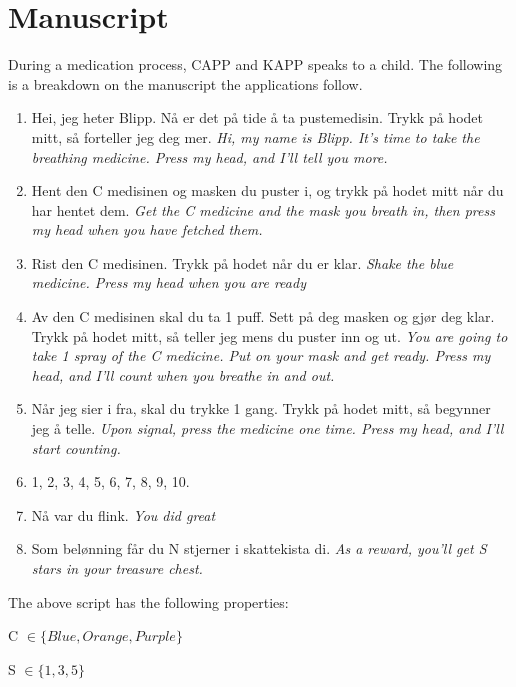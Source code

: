 \chapter{Manuscript}
\label{chp:anuscript} %
During a medication process, CAPP and KAPP speaks to a child. The following is a breakdown on the manuscript the applications follow.
\begin{enumerate}
  \item Hei, jeg heter Blipp. N\r{a} er det p\r{a} tide \r{a} ta pustemedisin. Trykk p\r{a} hodet mitt, s\r{a} forteller jeg deg mer. \emph{Hi, my name is Blipp. It's time to take the breathing medicine. Press my head, and I'll tell you more.}
  \item Hent den C medisinen og masken du puster i, og trykk p\r{a} hodet mitt n\r{a}r du har hentet dem. \emph{Get the C medicine and the mask you breath in, then press my head when you have fetched them.}
  \item Rist den C medisinen. Trykk p\r{a} hodet n\r{a}r du er klar. \emph{Shake the blue medicine. Press my head when you are ready}
  \item Av den C medisinen skal du ta 1 puff. Sett p\r{a} deg masken og gj\o r deg klar. Trykk p\r{a} hodet mitt, s\r{a} teller jeg mens du puster inn og ut. \emph{You are going to take 1 spray of the C medicine. Put on your mask and get ready. Press my head, and I'll count when you breathe in and out.} 
  \item N\r{a}r jeg sier i fra, skal du trykke 1 gang. Trykk p\r{a} hodet mitt, s\r{a} begynner jeg \r{a} telle. \emph{Upon signal, press the medicine one time. Press my head, and I'll start counting. }
  \item 1, 2, 3, 4, 5, 6, 7, 8, 9, 10.
  \item N\r{a} var du flink. \emph{You did great}
  \item Som bel\o nning f\r{a}r du N stjerner i skattekista di. \emph{As a reward, you'll get S stars in your treasure chest.}
\end{enumerate}

The above script has the following properties:

C $\in \{ Blue, Orange, Purple \}$


S $\in \{ 1, 3, 5 \}$ 
